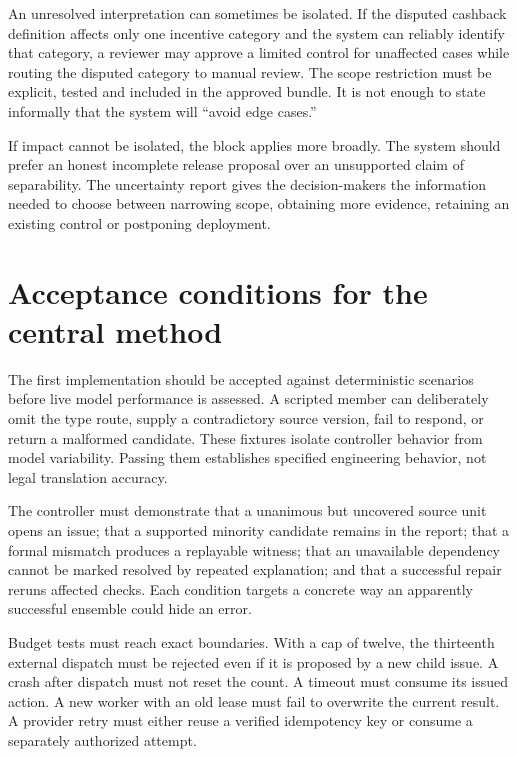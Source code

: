 \documentclass[12pt,a4paper,oneside,openany]{book}
\begin{document}
An unresolved interpretation can sometimes be isolated. If the disputed cashback
definition affects only one incentive category and the system can reliably
identify that category, a reviewer may approve a limited control for unaffected
cases while routing the disputed category to manual review. The scope restriction
must be explicit, tested and included in the approved bundle. It is not enough to
state informally that the system will ``avoid edge cases.''

If impact cannot be isolated, the block applies more broadly. The system should
prefer an honest incomplete release proposal over an unsupported claim of
separability. The uncertainty report gives the decision-makers the information
needed to choose between narrowing scope, obtaining more evidence, retaining an
existing control or postponing deployment.

\section{Acceptance conditions for the central method}
\label{merge:M06:25}


The first implementation should be accepted against deterministic scenarios
before live model performance is assessed. A scripted member can deliberately
omit the type route, supply a contradictory source version, fail to respond, or
return a malformed candidate. These fixtures isolate controller behavior from
model variability. Passing them establishes specified engineering behavior, not
legal translation accuracy.

The controller must demonstrate that a unanimous but uncovered source unit opens
an issue; that a supported minority candidate remains in the report; that a
formal mismatch produces a replayable witness; that an unavailable dependency
cannot be marked resolved by repeated explanation; and that a successful repair
reruns affected checks. Each condition targets a concrete way an apparently
successful ensemble could hide an error.

Budget tests must reach exact boundaries. With a cap of twelve, the thirteenth
external dispatch must be rejected even if it is proposed by a new child issue.
A crash after dispatch must not reset the count. A timeout must consume its
issued action. A new worker with an old lease must fail to overwrite the current
result. A provider retry must either reuse a verified idempotency key or consume
a separately authorized attempt.
\end{document}
